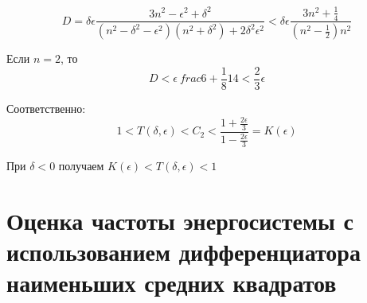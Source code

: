 \begin{equation}
\label{eq:equation110}
D = \delta \epsilon \frac{3n^2 - \epsilon^2 + \delta^2}{(n^2 - \delta^2 - \epsilon ^2)(n^2 + \delta ^2) + 2 \delta ^2 \epsilon^2} < \delta \epsilon \frac{3 n^2 + \frac{1}{4}}{(n^2 - \frac{1}{2})n^2}
\end{equation} 

Если $n = 2$, то
\begin{equation}
\label{eq:equation111}
D < \epsilon \ frac{6 + \frac{1}{8}}{14} < \frac{2}{3} \epsilon
\end{equation} 

Соответственно:
\begin{equation}
\label{eq:equation112}
1 < T(\delta, \epsilon) < C_{2} < \frac{1 + \frac{2 \epsilon}{3}}{1 - \frac{2 \epsilon}{3}} = K(\epsilon)
\end{equation} 

При $\delta <0$ получаем $K(\epsilon) < T(\delta, \epsilon) < 1$ 

\section{Оценка частоты энергосистемы с использованием дифференциатора наименьших средних квадратов} \label{sec:ch2/sec6}

